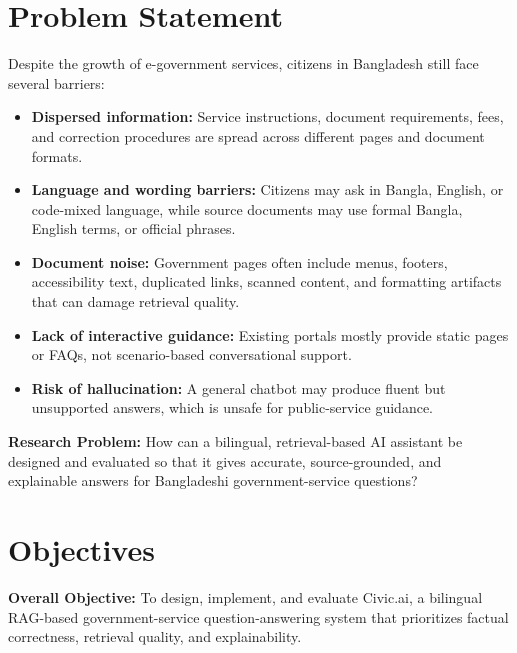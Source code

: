 \documentclass[12pt,oneside,openany]{report}
\begin{document}
\section{Problem Statement}
Despite the growth of e-government services, citizens in Bangladesh still face several barriers:

\begin{itemize}
    \item \textbf{Dispersed information:} Service instructions, document requirements, fees, and correction procedures are spread across different pages and document formats.
    \item \textbf{Language and wording barriers:} Citizens may ask in Bangla, English, or code-mixed language, while source documents may use formal Bangla, English terms, or official phrases.
    \item \textbf{Document noise:} Government pages often include menus, footers, accessibility text, duplicated links, scanned content, and formatting artifacts that can damage retrieval quality.
    \item \textbf{Lack of interactive guidance:} Existing portals mostly provide static pages or FAQs, not scenario-based conversational support.
    \item \textbf{Risk of hallucination:} A general chatbot may produce fluent but unsupported answers, which is unsafe for public-service guidance.
\end{itemize}

\textbf{Research Problem:} How can a bilingual, retrieval-based AI assistant be designed and evaluated so that it gives accurate, source-grounded, and explainable answers for Bangladeshi government-service questions?

\section{Objectives}
\textbf{Overall Objective:} To design, implement, and evaluate Civic.ai, a bilingual RAG-based government-service question-answering system that prioritizes factual correctness, retrieval quality, and explainability.
\end{document}
